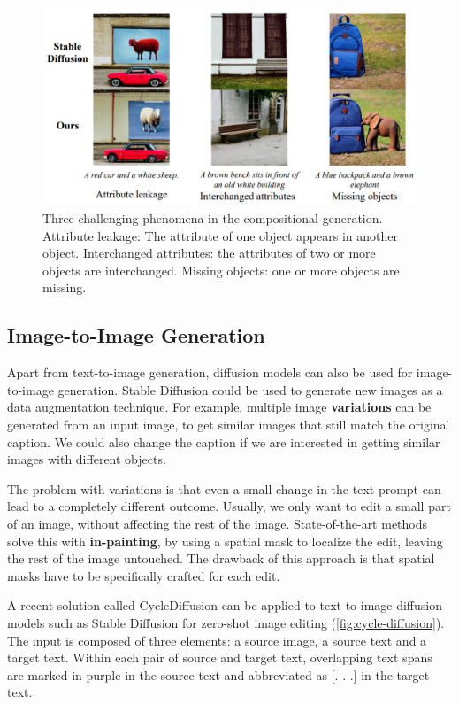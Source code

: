 \begin{figure}[ht]
    \centering
    \includegraphics[width=\linewidth]{images/future/training-free.png}
    \caption{Three challenging phenomena in the compositional generation. Attribute leakage: The attribute of one object appears in another object. Interchanged attributes: the attributes of two or more objects are interchanged. Missing objects: one or more objects are missing.}
    \label{fig:training-free}
\end{figure}

\subsection{Image-to-Image Generation} \label{sec:image-to-image}

Apart from text-to-image generation, diffusion models can also be used for image-to-image generation. Stable Diffusion \cite{rombach2021highresolution} could be used to generate new images as a data augmentation technique. For example, multiple image \textbf{variations} can be generated from an input image, to get similar images that still match the original caption. We could also change the caption if we are interested in getting similar images with different objects. 

The problem with variations is that even a small change in the text prompt can lead to a completely different outcome. Usually, we only want to edit a small part of an image, without affecting the rest of the image. State-of-the-art methods solve this with \textbf{in-painting}, by using a spatial mask to localize the edit, leaving the rest of the image untouched. The drawback of this approach is that spatial masks have to be specifically crafted for each edit. 

A recent solution called CycleDiffusion \cite{wu2022unifying} can be applied to text-to-image diffusion models such as Stable Diffusion for zero-shot image editing (\cref{fig:cycle-diffusion}). The input is composed of three elements: a source image, a source text and a target text. Within each pair of source and target text, overlapping
text spans are marked in purple in the source text and abbreviated as [. . .] in the target text.

